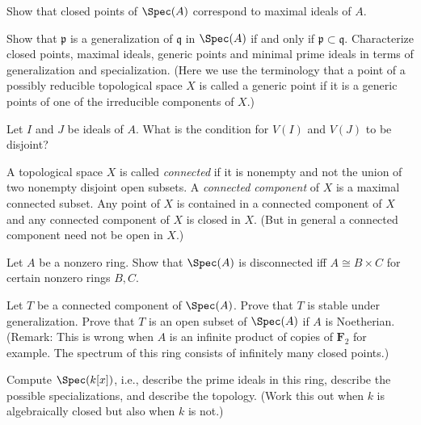 \begin{exercise}
\label{exercise-closed-maximal}
Show that closed points of $\Spec(A)$
correspond to maximal ideals of $A$.
\end{exercise}

\begin{exercise}
\label{exercise-generalization}
Show that ${\mathfrak p}$ is a generalization of ${\mathfrak q}$
in $\Spec(A)$ if and only if ${\mathfrak p}\subset {\mathfrak q}$.
Characterize closed points,
maximal ideals, generic points and minimal prime ideals in terms of
generalization and specialization. (Here we use the terminology that a point
of a possibly reducible topological space $X$ is called a generic point
if it is a generic points of one of the irreducible components of $X$.)
\end{exercise}

\begin{exercise}
\label{exercise-disjoint-closed-spec}
Let $I$ and $J$ be ideals of $A$.
What is the condition for $V(I)$ and $V(J)$ to be disjoint?
\end{exercise}

\begin{definition}
\label{definition-connected-component}
A topological space $X$ is called {\it connected} if it is nonempty and not the
union of two nonempty disjoint open subsets. A {\it connected component}
of $X$ is a maximal connected subset. Any point of $X$ is contained
in a connected component of $X$ and any connected component of $X$ is
closed in $X$. (But in general a connected component need not be open in $X$.)
\end{definition}

\begin{exercise}
\label{exercise-disconnected-spec}
Let $A$ be a nonzero ring.
Show that $\Spec(A)$ is disconnected
iff $A\cong B \times C$ for certain nonzero rings $B, C$.
\end{exercise}

\begin{exercise}
\label{exercise-connected-component-stable-generalization}
Let $T$ be a connected component
of $\Spec(A)$. Prove that $T$ is stable under generalization.
Prove that $T$ is an open subset of $\Spec(A)$ if $A$ is Noetherian.
(Remark: This is wrong when $A$ is an infinite product of copies of
${\mathbf F}_2$ for example. The spectrum of this ring consists of infinitely
many closed points.)
\end{exercise}

\begin{exercise}
\label{exercise-primes-kx}
Compute $\Spec(k[x])$, i.e., describe
the prime ideals in this ring, describe the possible specializations, and
describe the topology. (Work this out when $k$ is algebraically closed but
also when $k$ is not.)
\end{exercise}

